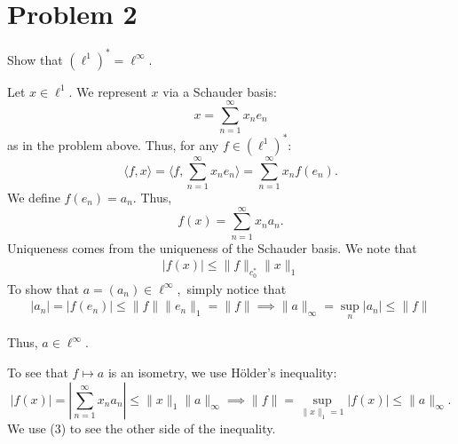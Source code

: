 \documentclass[11pt]{article}
\begin{document}
\newpage
\section*{Problem 2}
\begin{problem}
    Show that $(\ell^1)^* = \ell^\infty.$ 
\end{problem}
\begin{solution}
    Let $x\in \ell^1.$ We represent $x$ via a Schauder basis:
    \[x = \sum_{n=1}^\infty x_n e_n\] as in the problem above. Thus, for any $f\in (\ell^1)^*:$
    \[\langle f, x\rangle = \langle f, \sum_{n=1}^\infty x_n e_n \rangle = \sum_{n=1}^\infty x_n f(e_n).\] We define $f(e_n)= a_n.$ Thus, 
    \[f(x) = \sum_{n=1}^\infty x_na_n.\] Uniqueness comes from the uniqueness of the Schauder basis. We note that 
    \begin{align*}
        |f(x)| \leq \|f\|_{c_0^*}\|x\|_1
    \end{align*}
    To show that $a = (a_n)\in \ell^\infty,$ simply notice that 
    \begin{align}
|a_n| = |f(e_n)| \leq \|f\|\|e_n\|_1 = \|f\| \implies \|a\|_\infty = \sup_{n}|a_n| \leq \|f\|        
    \end{align}

Thus, $a \in \ell^\infty.$ 

To see that $f\mapsto a$ is an isometry, we use H\"older's inequality:
\[|f(x)| = \left|\sum_{n=1}^\infty x_n a_n\right|\leq \|x\|_1\|a\|_\infty \implies \|f\| = \sup_{\|x\|_1 = 1}|f(x)| \leq \|a\|_\infty.\] We use (3) to see the other side of the inequality.
\end{solution}

\newpage
\end{document}
